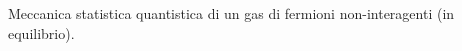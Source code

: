 


\minitoc\mtcskip

Meccanica statistica quantistica di un gas di fermioni non-interagenti (in
equilibrio).


